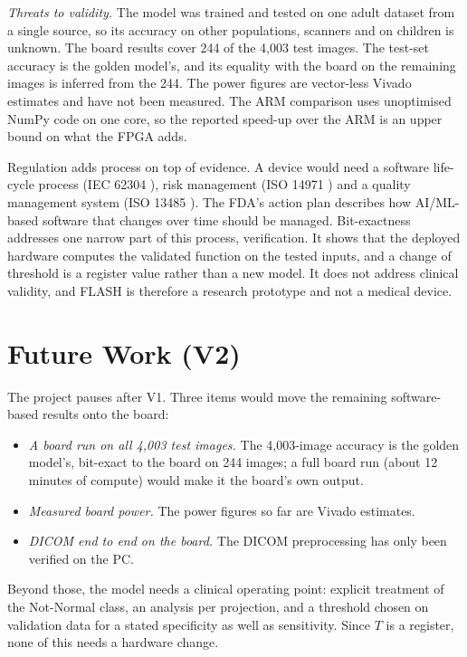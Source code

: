\documentclass[conference]{IEEEtran}
\begin{document}
\textit{Threats to validity.} The model was trained and tested on one adult dataset from a single
source, so its accuracy on other populations, scanners and on children is unknown. The board
results cover 244 of the 4,003 test images. The test-set accuracy is the golden model's, and its
equality with the board on the remaining images is inferred from the 244. The power figures are
vector-less Vivado estimates and have not been measured. The ARM comparison uses unoptimised
NumPy code on one core, so the reported speed-up over the ARM is an upper bound on what the FPGA
adds.

Regulation adds process on top of evidence. A device would need a software life-cycle process
(IEC 62304 \cite{iec62304}), risk management (ISO 14971 \cite{iso14971}) and a quality
management system (ISO 13485 \cite{iso13485}). The FDA's action plan \cite{fda2021aiml} describes
how AI/ML-based software that changes over time should be managed. Bit-exactness addresses one
narrow part of this process, verification. It shows that the deployed hardware computes the
validated function on the tested inputs, and a change of threshold is a register value rather
than a new model. It does not address clinical validity, and FLASH is therefore a research
prototype and not a medical device.

\section{Future Work (V2)}\label{sec:v2}

The project pauses after V1. Three items would move the remaining software-based results onto
the board:
\begin{itemize}
\item \textit{A board run on all 4,003 test images.} The 4,003-image accuracy is the golden
model's, bit-exact to the board on 244 images; a full board run (about 12 minutes of compute)
would make it the board's own output.
\item \textit{Measured board power.} The power figures so far are Vivado estimates.
\item \textit{DICOM end to end on the board.} The DICOM preprocessing has only been verified on
the PC.
\end{itemize}

Beyond those, the model needs a clinical operating point: explicit treatment of the Not-Normal
class, an analysis per projection, and a threshold chosen on validation data for a stated
specificity as well as sensitivity. Since $T$ is a register, none of this needs a hardware change.
\end{document}
